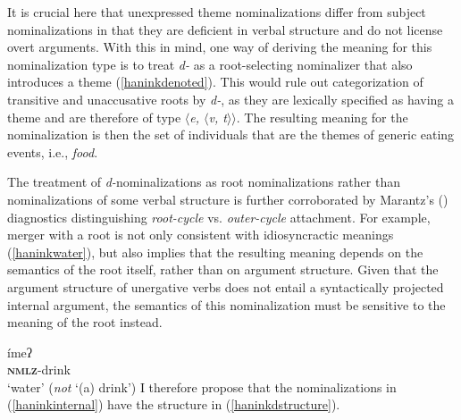 \documentclass[output=paper]{langscibook}
\begin{document}
It is crucial here that unexpressed theme nominalizations differ from subject nominalizations in that they are deficient in verbal structure and do not license overt arguments. With this in mind, one way of deriving the meaning for this nominalization type is to treat {\itshape d-} as a root-selecting nominalizer that also introduces a theme (\ref{haninkdenoted}). This would rule out categorization of transitive and unaccusative roots by {\itshape d-}, as they are lexically specified as having a theme and are therefore of type \textit{$\langle$e, $\langle$v, t$\rangle$$\rangle$}. The resulting meaning for the nominalization is then the set of individuals that are the themes of  generic eating events, i.e., {\itshape food}.

\ea 
{}
\label{haninkdenoted}
\z
\z

The treatment of {\itshape d-}nominalizations as root nominalizations rather than nominalizations of some verbal structure is further corroborated by Marantz's (\citeyear{marantz2001}) diagnostics distinguishing {\itshape root-cycle} vs. {\itshape outer-cycle} attachment. For example, merger with a root is not only consistent with idiosyncractic meanings (\ref{haninkwater}), but also implies that the resulting meaning depends on the semantics of the root itself, rather than on argument structure. Given that the argument structure of unergative verbs does not entail a syntactically projected internal argument, the semantics of this nominalization must be sensitive to the meaning of the root instead. 

\ea {}ímeʔ\\
\textbf{\textsc{nmlz}}-drink\\
\glt `water' ({\itshape not} `(a) drink') \label{haninkwater}
\z
I therefore propose that the nominalizations in (\ref{haninkinternal}) have the structure in (\ref{haninkdstructure}).

\ea \label{haninkdstructure}\

\vspace{-1em}\hspace{-2em}
 \z 
 
\end{document}
